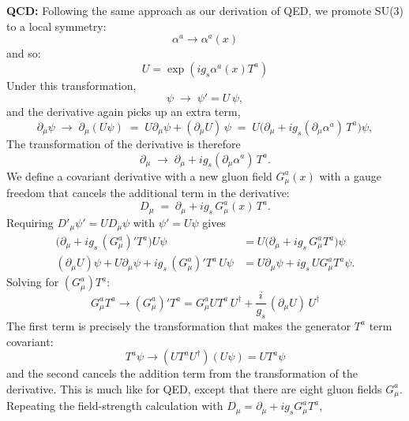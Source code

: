 \documentclass[12pt]{article}
\begin{document}
\noindent
{\bf QCD:}
Following the same approach as our derivation of QED, we promote SU(3) to a local symmetry:
$$\alpha^a \to \alpha^a(x)$$
and so:
$$U = \exp(i g_s \alpha^a(x) T^a)$$
Under this transformation,
\begin{equation*}
    \psi \;\longrightarrow\; \psi' = U\,\psi,
\end{equation*}
and the derivative again picks up an extra term,
\begin{equation*}
    \partial_\mu \psi \;\longrightarrow\; \partial_\mu(U\psi)
       \;=\; U \partial_\mu \psi + (\partial_\mu U)\,\psi
       \;=\; U\big(\partial_\mu + i g_s (\partial_\mu \alpha^a)\, T^a\big)\psi,
\end{equation*}
The transformation of the derivative is therefore
\begin{equation*}
    \partial_\mu \;\longrightarrow\; \partial_\mu + i g_s (\partial_\mu \alpha^a)\, T^a.
\end{equation*}
We define a covariant derivative with a new gluon field $G^a_\mu(x)$ with a gauge freedom that cancels the additional term in the derivative:
\begin{equation}
 \label{eqn:covd-qcd}
    D_\mu \;=\; \partial_\mu + i g_s\, G^a_\mu(x)\, T^a.
\end{equation}
Requiring $D'_\mu \psi' = U D_\mu \psi$ with $\psi' = U\psi$ gives
\begin{align}
    \big( \partial_\mu + i g_s\, (G^a_\mu)' T^a \big) U\psi
       &= U \big( \partial_\mu + i g_s\, G^a_\mu T^a \big) \psi \\
    (\partial_\mu U)\psi + U \partial_\mu \psi + i g_s\, (G^a_\mu)' T^a\, U\psi
       &= U \partial_\mu \psi + i g_s\, U G^a_\mu T^a \psi.
\end{align}
Solving for $(G^a_\mu) T^a$:
\begin{equation}
  \label{eqn:gluon-transformation}
  G^a_\mu T^a \to (G^a_\mu)' T^a = G^a_\mu U T^a\, U^\dagger
  + \frac{i}{g_s}\,(\partial_\mu U)\, U^\dagger
\end{equation}
The first term is precisely the transformation that makes the generator $T^a$ 
term covariant:
\begin{equation}
T^a \psi \to \left( U T^a U^\dagger \right) \left(U \psi \right) = U T^a \psi
\end{equation}
and the second cancels the addition term from the transformation of the derivative.  This is much like for QED, except that there are eight gluon fields $G^a_\mu$.
Repeating the field-strength calculation with
$D_\mu = \partial_\mu + i g_s G^a_\mu T^a$,
\end{document}
